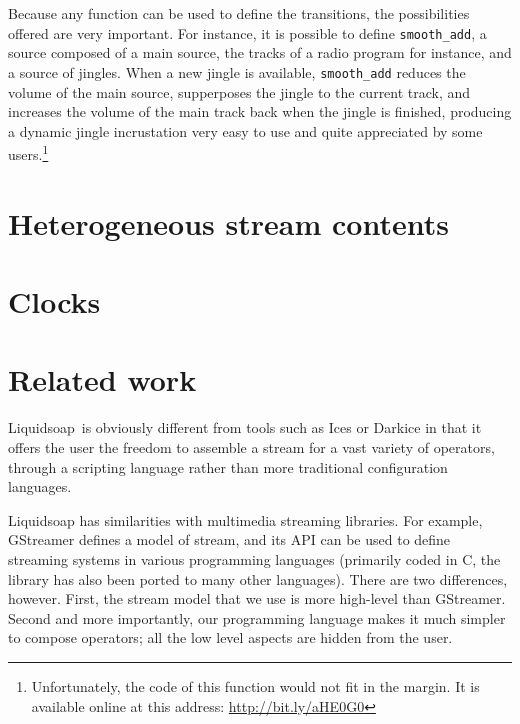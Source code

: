 \documentclass{llncs}
\newcommand{\liquidsoap}{Liquidsoap}
\begin{document}
Because any function can be used to define the transitions, the 
possibilities offered are very important. For instance, it is possible
to define \texttt{smooth\_add}, a source composed of a main source, 
the tracks of a radio program for instance, and a source of jingles. 
When a new jingle is available, \texttt{smooth\_add} reduces the volume of 
the main source, supperposes the jingle to the current track, and 
increases the volume of the main track back when the jingle is finished,
producing a dynamic jingle incrustation very easy to use and quite appreciated
by some users.\footnote{Unfortunately, the code of this function would not 
fit in the margin. It is available online at this address: 
\url{http://bit.ly/aHE0G0}}

\section{Heterogeneous stream contents}
\label{sec:content}



\section{Clocks}



\section{Related work}

\liquidsoap\ is obviously different from tools such as Ices or Darkice in
that it offers the user the freedom to assemble a stream
for a vast variety of operators, through a scripting
language rather than more traditional configuration languages.

\liquidsoap{} has similarities with multimedia streaming libraries.
For example, GStreamer defines a model of stream, and its API
can be used to define streaming systems in various programming
languages (primarily coded in C, the library has also been
ported to many other languages).
There are two differences, however.
First, the stream model that we use is more high-level than
GStreamer. %
Second and more importantly,
our programming language makes it much simpler
to compose operators; all the low level aspects are hidden
from the user.
\end{document}
